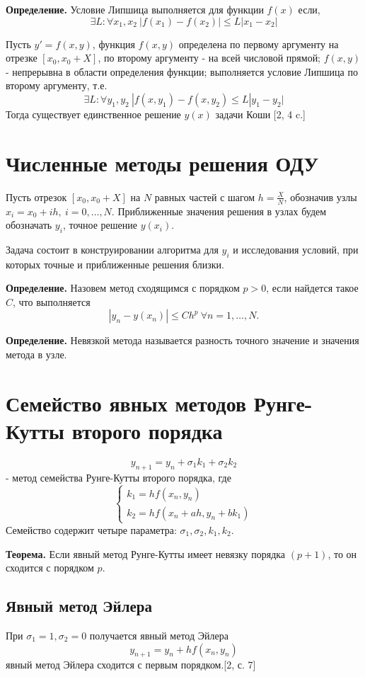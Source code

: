 \documentclass[a4paper, 14pt]{extarticle}
\begin{document}
\par \textbf{Определение.}  Условие Липшица выполняется для функции \(f(x)\) если,
\[\exists L :\forall x_1,x_2 ~ |f(x_1)-f(x_2)|\leqslant L|x_1-x_2|\]

\par
Пусть \(y'=f(x,y)\), функция \(f(x,y)\) определена по первому аргументу на отрезке 
\([x_0,x_0+X]\), по второму аргументу - на всей числовой прямой; \(f(x,y)\) - непрерывна
в области определения функции; выполняется условие Липшица по второму аргументу, т.е.
\[\exists L:\forall y_1,y_2 ~ |f(x,y_1)-f(x,y_2)\leqslant L|y_1-y_2|\]
Тогда существует единственное решение \(y(x)\) задачи Коши [2, 4 c.]

\section{Численные методы решения ОДУ}
Пусть отрезок \([x_0,x_0+X]\) на \(N\) равных частей с шагом \(h=\frac{X}{N}\), обозначив 
узлы \(x_i=x_0+ih,~i=0,\ldots,N\). Приближенные значения решения в узлах будем обозначать \(y_i\),
точное решение \(y(x_i)\).
\par
Задача состоит в конструировании алгоритма для \(y_i\) и исследования условий, при которых 
точные и приближенные решения близки.
\par \textbf{Определение.} Назовем метод сходящимся с порядком \(p>0\), если найдется такое \(C\), что выполняется 
\[|y_n-y(x_n)|\leqslant Ch^p ~ \forall n =1,\ldots,N.\]
\par \textbf{Определение.} Невязкой метода называется разность точного значение и значения метода в узле.

\section{Семейство явных методов Рунге-Кутты второго порядка}
\[y_{n+1}=y_n+\sigma_1k_1+\sigma_2k_2\]
- метод семейства Рунге-Кутты второго порядка, где
\[
\begin{cases}
    k_1 = hf(x_n,y_n) \\ 
    k_2 = hf(x_n+ah,y_n+bk_1) 
\end{cases}
\]
Семейство содержит четыре параметра: \(\sigma_1,\sigma_2,k_1,k_2\).

\par \textbf{Теорема.} Если явный метод Рунге-Кутты имеет
невязку порядка \((p + 1)\), то он сходится с порядком \(p\).

\subsection{Явный метод Эйлера}
При \(\sigma_1=1, \sigma_2=0\) получается явный метод Эйлера
\[y_{n+1}=y_n+hf(x_n,y_n)\]
явный метод Эйлера сходится с первым порядком.[2, с. 7]
\end{document}
